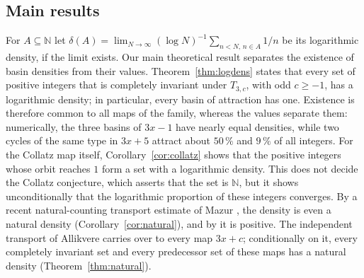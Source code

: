 \documentclass[12pt]{amsart}
\theoremstyle{definition}
\theoremstyle{remark}
\newcommand{\N}{\mathbb{N}}
\begin{document}
\subsection*{Main results}
For $A\subseteq\N$ let $\delta(A)=\lim_{N\to\infty}(\log N)^{-1}\sum_{n<N,\,n\in A}1/n$ be its logarithmic density, if the limit exists. Our main theoretical result separates the existence of basin densities from their values. Theorem~\ref{thm:logdens} states that every set of positive integers that is completely invariant under $T_{3,c}$, with odd $c\ge-1$, has a logarithmic density; in particular, every basin of attraction has one. Existence is therefore common to all maps of the family, whereas the values separate them: numerically, the three basins of $3x-1$ have nearly equal densities, while two cycles of the same type in $3x+5$ attract about $50\,\%$ and $9\,\%$ of all integers. For the Collatz map itself, Corollary~\ref{cor:collatz} shows that the positive integers whose orbit reaches $1$ form a set with a logarithmic density. This does not decide the Collatz conjecture, which asserts that the set is $\N$, but it shows unconditionally that the logarithmic proportion of these integers converges. By a recent natural-counting transport estimate of Mazur \cite{Mazur_2026}, the density is even a natural density (Corollary~\ref{cor:natural}), and by \cite{Mazur_PD_2026} it is positive. The independent transport of Allikvere \cite{Allikvere_2026} carries over to every map $3x+c$; conditionally on it, every completely invariant set and every predecessor set of these maps has a natural density (Theorem~\ref{thm:natural}).
\end{document}
